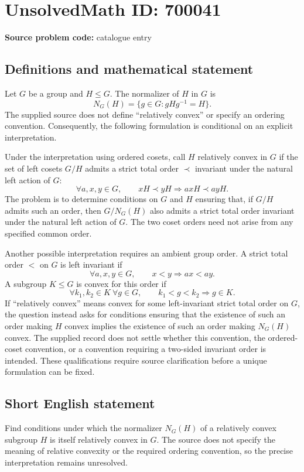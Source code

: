 \documentclass[11pt]{article}
\begin{document}
\section*{UnsolvedMath ID: 700041}
\textbf{Source problem code:} catalogue entry
\subsection{Definitions and mathematical statement}
Let \(G\) be a group and \(H\leq G\). The normalizer of \(H\) in \(G\) is
\[
N_G(H)=\{g\in G:gHg^{-1}=H\}.
\]
The supplied source does not define ``relatively convex'' or specify an ordering convention. Consequently, the following formulation is conditional on an explicit interpretation.

Under the interpretation using ordered cosets, call \(H\) relatively convex in \(G\) if the set of left cosets \(G/H\) admits a strict total order \(\prec\) invariant under the natural left action of \(G\):
\[
\forall a,x,y\in G,\qquad xH\prec yH\Longrightarrow axH\prec ayH.
\]
The problem is to determine conditions on \(G\) and \(H\) ensuring that, if \(G/H\) admits such an order, then \(G/N_G(H)\) also admits a strict total order invariant under the natural left action of \(G\). The two coset orders need not arise from any specified common order.

Another possible interpretation requires an ambient group order. A strict total order \(<\) on \(G\) is left invariant if
\[
\forall a,x,y\in G,\qquad x<y\Longrightarrow ax<ay.
\]
A subgroup \(K\leq G\) is convex for this order if
\[
\forall k_1,k_2\in K\ \forall g\in G,\qquad k_1<g<k_2\Longrightarrow g\in K.
\]
If ``relatively convex'' means convex for some left-invariant strict total order on \(G\), the question instead asks for conditions ensuring that the existence of such an order making \(H\) convex implies the existence of such an order making \(N_G(H)\) convex. The supplied record does not settle whether this convention, the ordered-coset convention, or a convention requiring a two-sided invariant order is intended. These qualifications require source clarification before a unique formulation can be fixed.
\subsection{Short English statement}
Find conditions under which the normalizer \(N_G(H)\) of a relatively convex subgroup \(H\) is itself relatively convex in \(G\). The source does not specify the meaning of relative convexity or the required ordering convention, so the precise interpretation remains unresolved.
\end{document}
